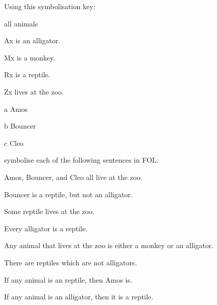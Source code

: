 \problempart\label{pr.FOLalligators}
Using this symbolisation key:
\begin{ekey}
\item[\text{domain}] all animals
\item[Ax]  is an alligator.
\item[Mx]  is a monkey.
\item[Rx]  is a reptile.
\item[Zx]  lives at the zoo.
\item[a] Amos
\item[b] Bouncer
\item[c] Cleo
\end{ekey}
symbolise each of the following sentences in FOL:
\begin{earg}
\item Amos, Bouncer, and Cleo all live at the zoo. 
\item[] 
\item Bouncer is a reptile, but not an alligator. 
\item[] 
\item Some reptile lives at the zoo. 
\item[] 
\item Every alligator is a reptile. 
\item[] 
\item Any animal that lives at the zoo is either a monkey or an alligator. 
\item[] 
\item There are reptiles which are not alligators.
\item[] 
\item If any animal is an reptile, then Amos is.
\item[] 
\item If any animal is an alligator, then it is a reptile.
\item[] 
\end{earg}

